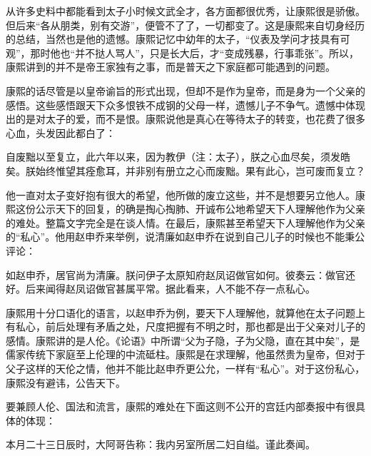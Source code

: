 从许多史料中都能看到太子小时候文武全才，各方面都很优秀，让康熙很是骄傲。但后来“各从朋类，别有交游”，便管不了了，一切都变了。这是康熙来自切身经历的总结，当然也是他的遗憾。康熙记忆中幼年的太子，“仪表及学问才技具有可观”，那时他也“并不挞人骂人”，只是长大后，才“变成残暴，行事乖张”。所以，康熙讲到的并不是帝王家独有之事，而是普天之下家庭都可能遇到的问题。



康熙的话尽管是以皇帝谕旨的形式出现，但却不是作为皇帝，而是身为一个父亲的感悟。这些感悟跟天下众多恨铁不成钢的父母一样，遗憾儿子不争气。遗憾中体现出的是对太子的爱，而不是恨。康熙说他是真心在等待太子的转变，也花费了很多心血，头发因此都白了：



\begin{bookquote}自废黜以至复立，此六年以来，因为教伊（注：太子），朕之心血尽矣，须发皓矣。朕始终惟望其痊愈耳，并非别有册立之心而废黜。果有此心，岂可废而复立？\end{bookquote}


他一直对太子变好抱有很大的希望，他所做的废立这些，并不是想要另立他人。康熙这份公示天下的回复，的确是掏心掏肺、开诚布公地希望天下人理解他作为父亲的难处。整篇文字完全是在谈人情。在最后，康熙甚至希望天下人理解他作为父亲的“私心”。他用赵申乔来举例，说清廉如赵申乔在说到自己儿子的时候也不能秉公评论：



\begin{bookquote}如赵申乔，居官尚为清廉。朕问伊子太原知府赵凤诏做官如何。彼奏云：做官还好。后来闻得赵凤诏做官甚属平常。据此看来，人不能不存一点私心。\end{bookquote}


康熙用十分口语化的语言，以赵申乔为例，要天下人理解他，就算他在太子问题上有私心，前后处理有矛盾之处，尺度把握有不明之时，那也都是出于父亲对儿子的感情。康熙讲的是人伦。《论语》中所谓“父为子隐，子为父隐，直在其中矣”，是儒家传统下家庭至上伦理的中流砥柱。康熙是在求理解，他虽然贵为皇帝，但对于父子这样的天伦之情，他并不能比赵申乔更公允，一样有“私心”。对于这份私心，康熙没有避讳，公告天下。



要兼顾人伦、国法和流言，康熙的难处在下面这则不公开的宫廷内部奏报中有很具体的体现：



\begin{bookquote}本月二十三日辰时，大阿哥告称：我内另室所居二妇自缢。谨此奏闻。\end{bookquote}

